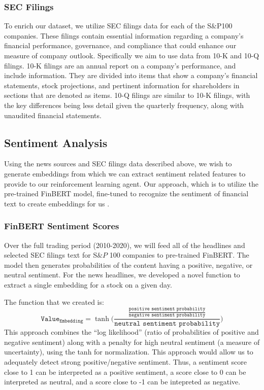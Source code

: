 \subsubsection{SEC Filings}\label{filings}

To enrich our dataset, we utilize SEC filings data for each of the S$\&$P100 companies. 
These filings contain essential information regarding a company's financial 
performance, governance, and compliance that could enhance our measure of 
company outlook. Specifically we aim to use data from 10-K and 10-Q filings. 
10-K filings are an annual report on a company’s performance, and include information. 
They are divided into items that show a company’s financial statements, 
stock projections, and pertinent information for shareholders in sections that 
are denoted as items. 10-Q filings are similar to 10-K filings, with the key differences being less detail given the quarterly frequency, along with unaudited financial statements.


\subsection{Sentiment Analysis}

Using the news sources and SEC filings data described above, we wish to 
generate embeddings from which we can extract sentiment related features 
to provide to our reinforcement learning agent. Our approach, which is to utilize the pre-trained 
FinBERT model, fine-tuned to recognize the sentiment of financial text to 
create embeddings for us \cite{finbert}. 

\subsubsection{FinBERT Sentiment Scores}\label{finbert}

Over the full trading period (2010-2020), we will feed all of the headlines and selected SEC filings text for S$\&P$ 100 companies to pre-trained FinBERT. 
The model then generates probabilities of the content having a positive, negative, or neutral sentiment. For the news headlines, we developed a novel function to extract a single embedding for a stock on a given day. 

The function that we created is:
\[\texttt{Value}_{\texttt{Embedding}} = \tanh\Biggl( \frac{\frac{\texttt{positive sentiment probability}}{\texttt{negative sentiment probability}}}{\texttt{neutral sentiment probability}} \Biggr)\]
This approach combines the “log likelihood” (ratio of probabilities of positive and 
negative sentiment) along with a penalty for high neutral sentiment (a measure of 
uncertainty), using the tanh for normalization. This approach would allow us to 
adequately detect strong positive/negative sentiment. Thus, a sentiment score close to 1 can be interpreted as a positive sentiment, a score close to 0 can be interpreted as neutral, and a score close to -1 can be intepreted as negative.

